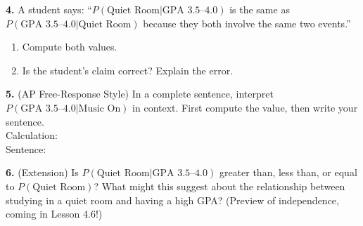 \documentclass[10pt]{article}
\begin{document}
\begin{practicebox}
\vspace{8pt}
\textbf{4.} A student says: ``$P(\text{Quiet Room}|\text{GPA 3.5--4.0})$ is the same
as $P(\text{GPA 3.5--4.0}|\text{Quiet Room})$ because they both involve the same two events.''
\begin{enumerate}[label=(\alph*), leftmargin=2em, itemsep=6pt]
  \item Compute both values. \writeline\writeline
  \item Is the student's claim correct? Explain the error. \writeline\writeline
\end{enumerate}

\vspace{8pt}
\textbf{5.} (AP Free-Response Style) In a complete sentence, interpret
$P(\text{GPA 3.5--4.0} | \text{Music On})$ in context.
First compute the value, then write your sentence.\\
Calculation: \blank{6cm}\\
Sentence: \writeline\writeline

\vspace{8pt}
\textbf{6.} (Extension) Is $P(\text{Quiet Room}|\text{GPA 3.5--4.0})$ greater than,
less than, or equal to $P(\text{Quiet Room})$? What might this suggest about
the relationship between studying in a quiet room and having a high GPA?
(Preview of independence, coming in Lesson 4.6!)\\
\writeline\writeline\writeline
\end{practicebox}
\end{document}
